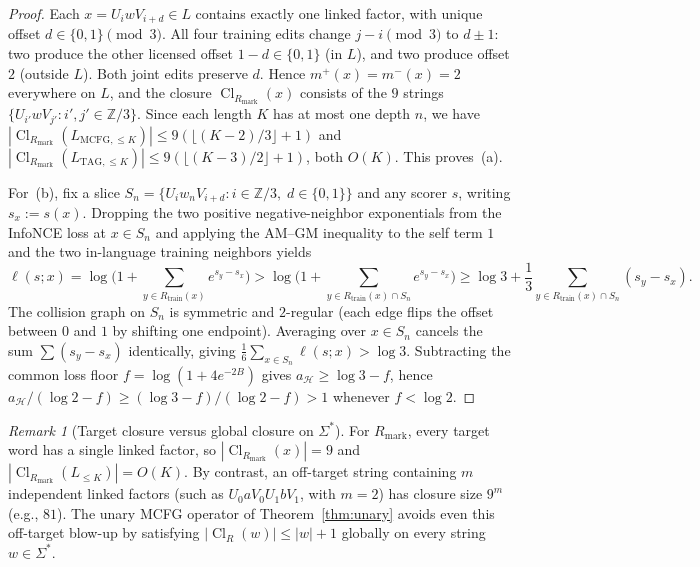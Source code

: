 \documentclass[11pt]{article}
\theoremstyle{plain}
\theoremstyle{definition}
\theoremstyle{remark}
\newtheorem{remark}{Remark}
\DeclareMathOperator{\Cl}{Cl}
\begin{document}
\begin{proof}
Each $x = U_i w V_{i+d} \in L$ contains exactly one linked factor, with unique offset $d \in \{0, 1\} \pmod 3$. All four training edits change $j - i \pmod 3$ to $d \pm 1$: two produce the other licensed offset $1 - d \in \{0, 1\}$ (in $L$), and two produce offset $2$ (outside $L$). Both joint edits preserve $d$. Hence $m^+(x) = m^-(x) = 2$ everywhere on $L$, and the closure $\Cl_{R_{\mathrm{mark}}}(x)$ consists of the $9$ strings $\{U_{i'} w V_{j'} : i', j' \in \mathbb{Z}/3\}$. Since each length $K$ has at most one depth $n$, we have $|\Cl_{R_{\mathrm{mark}}}(L_{\mathrm{MCFG},\le K})| \le 9(\lfloor (K-2)/3 \rfloor + 1)$ and $|\Cl_{R_{\mathrm{mark}}}(L_{\mathrm{TAG},\le K})| \le 9(\lfloor (K-3)/2 \rfloor + 1)$, both $O(K)$. This proves~(a).

For~(b), fix a slice $S_n = \{U_i w_n V_{i+d} : i \in \mathbb{Z}/3,\; d \in \{0, 1\}\}$ and any scorer $s$, writing $s_x := s(x)$. Dropping the two positive negative-neighbor exponentials from the InfoNCE loss at $x \in S_n$ and applying the AM--GM inequality to the self term $1$ and the two in-language training neighbors yields
\[
\ell(s; x)
= \log\!\biggl(1 + \sum_{y \in R_{\mathrm{train}}(x)} e^{s_y - s_x}\biggr)
> \log\!\biggl(1 + \sum_{y \in R_{\mathrm{train}}(x) \cap S_n} e^{s_y - s_x}\biggr)
\ge \log 3 + \frac{1}{3} \sum_{y \in R_{\mathrm{train}}(x) \cap S_n} (s_y - s_x).
\]
The collision graph on $S_n$ is symmetric and $2$-regular (each edge flips the offset between $0$ and $1$ by shifting one endpoint). Averaging over $x \in S_n$ cancels the sum $\sum (s_y - s_x)$ identically, giving $\frac{1}{6}\sum_{x \in S_n} \ell(s; x) > \log 3$. Subtracting the common loss floor $f = \log(1 + 4e^{-2B})$ gives $a_{\mathcal{H}} \ge \log 3 - f$, hence $a_{\mathcal{H}}/(\log 2 - f) \ge (\log 3 - f)/(\log 2 - f) > 1$ whenever $f < \log 2$.
\end{proof}

\begin{remark}[Target closure versus global closure on $\Sigma^*$]
For $R_{\mathrm{mark}}$, every target word has a single linked factor, so $|\Cl_{R_{\mathrm{mark}}}(x)| = 9$ and $|\Cl_{R_{\mathrm{mark}}}(L_{\le K})| = O(K)$. By contrast, an off-target string containing $m$ independent linked factors (such as $U_0 a V_0 U_1 b V_1$, with $m = 2$) has closure size $9^m$ (e.g., $81$). The unary MCFG operator of Theorem~\ref{thm:unary} avoids even this off-target blow-up by satisfying $|\Cl_R(w)| \le |w| + 1$ globally on every string $w \in \Sigma^*$.
\end{remark}
\end{document}
